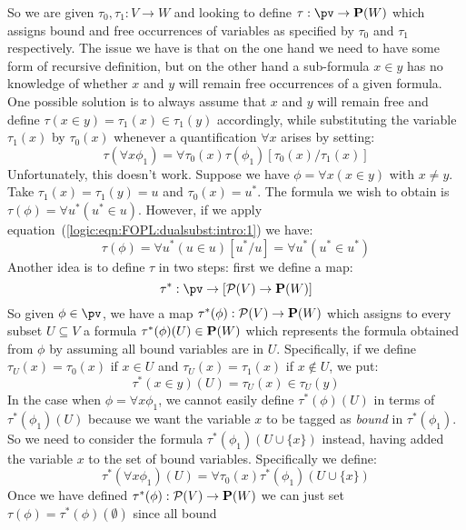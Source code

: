 So we are given $\tau_{0},\tau_{1}:V\to W$ and looking to define
$\tau:\pv\to{\bf P}(W)$ which assigns bound and free occurrences of
variables as specified by $\tau_{0}$ and $\tau_{1}$ respectively.
The issue we have is that on the one hand we need to have some form
of recursive definition, but on the other hand a sub-formula $x\in
y$ has no knowledge of whether $x$ and $y$ will remain free
occurrences of a given formula. One possible solution is to always
assume that $x$ and $y$ will remain free and define $\tau(x\in
y)=\tau_{1}(x)\in\tau_{1}(y)$ accordingly, while substituting the
variable $\tau_{1}(x)$ by $\tau_{0}(x)$ whenever a quantification
$\forall x$ arises by setting:
     \begin{equation}\label{logic:eqn:FOPL:dualsubst:intro:1}
     \tau(\forall
     x\phi_{1})=\forall\tau_{0}(x)\tau(\phi_{1})[\tau_{0}(x)/\tau_{1}(x)]
    \end{equation}
Unfortunately, this doesn't work. Suppose we have $\phi=\forall
x(x\in y)$ with $x\neq y$. Take $\tau_{1}(x)=\tau_{1}(y)=u$ and
$\tau_{0}(x)=u^{*}$. The formula we wish to obtain is
$\tau(\phi)=\forall u^{*}(u^{*}\in u)$. However, if we apply
equation~(\ref{logic:eqn:FOPL:dualsubst:intro:1}) we have:
    \[
    \tau(\phi)=\forall u^{*}(u\in u)[u^{*}/u]=\forall u^{*}(u^{*}\in
    u^{*})
    \]
Another idea is to define $\tau$ in two steps: first we define a
map:
    \[
    \tau^{*}:\pv\to[{\cal P}(V)\to{\bf P}(W)]
    \]
So given $\phi\in\pv$, we have a map $\tau^{*}(\phi):{\cal
P}(V)\to{\bf P}(W)$ which assigns to every subset $U\subseteq V$ a
formula $\tau^{*}(\phi)(U)\in{\bf P}(W)$ which represents the
formula obtained from $\phi$ by assuming all bound variables are in
$U$. Specifically, if we define $\tau_{U}(x)=\tau_{0}(x)$ if $x\in
U$ and $\tau_{U}(x)=\tau_{1}(x)$ if $x\not\in U$, we put:
    \[
    \tau^{*}(x\in y)(U) = \tau_{U}(x)\in\tau_{U}(y)
    \]
In the case when $\phi=\forall x\phi_{1}$, we cannot easily define
$\tau^{*}(\phi)(U)$ in terms of $\tau^{*}(\phi_{1})(U)$ because we
want the variable $x$ to be tagged as {\em bound} in
$\tau^{*}(\phi_{1})$. So we need to consider the formula
$\tau^{*}(\phi_{1})(U\cup\{x\})$ instead, having added the
variable $x$ to the set of bound variables. Specifically
we define:
    \begin{equation}\label{logic:eqn:FOPL:dualsubst:intro:2}
    \tau^{*}(\forall
    x\phi_{1})(U)=\forall\tau_{0}(x)\tau^{*}(\phi_{1})(U\cup\{x\})
    \end{equation}
Once we have defined $\tau^{*}(\phi):{\cal P}(V)\to{\bf P}(W)$ we
can just set $\tau(\phi)=\tau^{*}(\phi)(\emptyset)$ since all bound 
